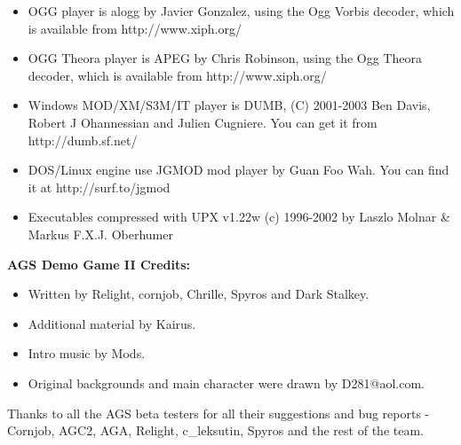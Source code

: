 \begin{itemize}
\item OGG player is alogg by Javier Gonzalez, using the Ogg Vorbis decoder, which is available
from http://www.xiph.org/
\item OGG Theora player is APEG by Chris Robinson, using the Ogg Theora decoder, which is available
from http://www.xiph.org/
\item Windows MOD/XM/S3M/IT player is DUMB, (C) 2001-2003 Ben Davis, Robert J Ohannessian
and Julien Cugniere. You can get it from http://dumb.sf.net/
\item DOS/Linux engine use JGMOD mod player by Guan Foo Wah. You can find it at
  http://surf.to/jgmod
\item Executables compressed with UPX v1.22w (c) 1996-2002 by Laszlo Molnar & Markus F.X.J. Oberhumer
\end{itemize}

\bf{AGS Demo Game II Credits:}

\begin{itemize}
\item Written by Relight, cornjob, Chrille, Spyros and Dark Stalkey.
\item Additional material by Kairus.
\item Intro music by Mods.
\item Original backgrounds and main character were drawn by D281@aol.com.
\end{itemize}

Thanks to all the AGS beta testers for all their suggestions and bug reports -
Cornjob, AGC2, AGA, Relight, c_leksutin, Spyros and the rest of the team.



